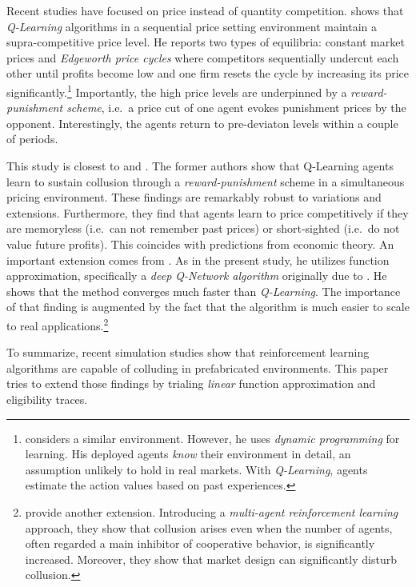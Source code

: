 Recent studies have focused on price instead of quantity competition. \textcite{klein_autonomous_2019} shows that \emph{Q-Learning} algorithms in a sequential price setting environment maintain a supra-competitive price level. He reports two types of equilibria: constant market prices and \emph{Edgeworth price cycles} where competitors sequentially undercut each other until profits become low and one firm resets the cycle by increasing its price significantly.\footnote{\textcite{noel_edgeworth_2008} considers a similar environment. However, he uses \emph{dynamic programming} for learning. His deployed agents \emph{know} their environment in detail, an assumption unlikely to hold in real markets. With \emph{Q-Learning}, agents estimate the action values based on past experiences.} Importantly, the high price levels are underpinned by a \emph{reward-punishment scheme}, i.e.\ a price cut of one agent evokes punishment prices by the opponent. Interestingly, the agents return to pre-deviaton levels within a couple of periods.

This study is closest to \textcite{calvano_artificial_2020} and \textcite{hettich_algorithmic_2021}. The former authors show that Q-Learning agents learn to sustain collusion through a \emph{reward-punishment} scheme in a simultaneous pricing environment. These findings are remarkably robust to variations and extensions. Furthermore, they find that agents learn to price competitively if they are memoryless (i.e.\ can not remember past prices) or short-sighted (i.e.\ do not value future profits). This coincides with predictions from economic theory. An important extension comes from \textcite{hettich_algorithmic_2021}. As in the present study, he utilizes function approximation, specifically a \emph{deep Q-Network algorithm} originally due to \textcite{mnih_human-level_2015}. He shows that the method converges much faster than \emph{Q-Learning}. The importance of that finding is augmented by the fact that the algorithm is much easier to scale to real applications.\footnote{\textcite{johnson_platform_2020} provide another extension. Introducing a \emph{multi-agent reinforcement learning} approach, they show that collusion arises even when the number of agents, often regarded a main inhibitor of cooperative behavior, is significantly increased. Moreover, they show that market design can significantly disturb collusion.}

To summarize, recent simulation studies show that reinforcement learning algorithms are capable of colluding in prefabricated environments. This paper tries to extend those findings by trialing \emph{linear} function approximation and eligibility traces.





